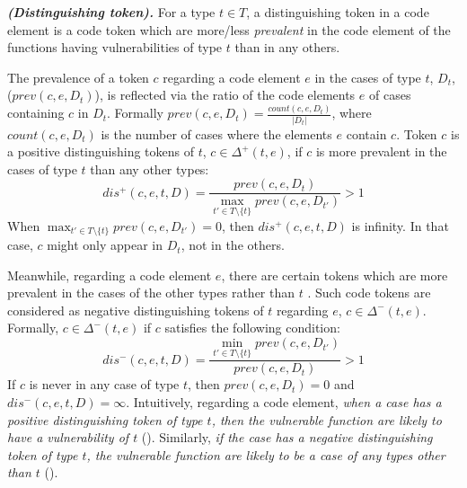 \begin{definition}{\textit{\textbf{(Distinguishing token).}}}
For a type $t \in T$, a distinguishing token in a code element is a code token which are more/less \textit{prevalent} in the code element of the functions having vulnerabilities of type $t$ than in any others.
\end{definition}
%
The prevalence of a token $c$ regarding a code element $e$ in the cases of type $t$, $D_t$, ($prev(c, e, D_t)$), is reflected via the ratio of the code elements $e$ of cases containing $c$ in $D_t$. Formally $prev(c, e, D_t) = \frac{count(c, e, D_t)}{|D_t|}$, where $count(c, e, D_t)$ is the number of cases where the elements $e$ contain $c$. Token $c$ is a positive distinguishing tokens of $t$, $c \in \Delta^+(t, e)$, if $c$ is more prevalent in the cases of type $t$ than any other types: 
%
$$
dis^+(c, e, t, D) = \frac{prev(c, e, D_t)}{\max_{t' \in T \setminus \{t\}} prev(c, e, D_{t'})} > 1
$$
%
%
When $\max_{t' \in T \setminus \{t\}} prev(c, e, D_{t'}) = 0$, then $dis^+(c, e, t, D)$ is infinity. In that case, $c$ might only appear in $D_t$, not in the others.
%
%

Meanwhile, regarding a code element $e$, there are certain tokens which are more prevalent in the cases of the other types rather than $t$ . Such code tokens are considered as negative distinguishing tokens of $t$ regarding $e$, $c \in \Delta^-(t, e)$. Formally, $c \in \Delta^-(t, e)$ if $c$ satisfies the following condition:
%
$$
dis^-(c, e, t, D) = \frac{\min_{t' \in T \setminus \{t\}} prev(c, e, D_{t'})}{prev(c, e, D_t)} > 1
$$
%
%
%
%
If $c$ is never in any case of type $t$, then $prev(c, e, D_t) = 0$ and $dis^-(c, e, t, D) = \infty$.
%
Intuitively, regarding a code element, \textit{when a case has a positive distinguishing token of type $t$, then the vulnerable function are likely to have a vulnerability of $t$} (\rp). Similarly, \textit{if the case has a negative distinguishing token of type $t$, the vulnerable function are likely to be a case of any types other than $t$} (\rn).


